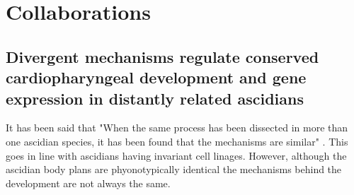 \chapter{Collaborations}
\section{Divergent mechanisms regulate conserved cardiopharyngeal development and gene expression in distantly related ascidians}

It has been said that "When the same process has been dissected in more than one ascidian species, it has been found that the mechanisms are similar" \cite{lemaire_ascidians_2008}. This goes in line with ascidians having invariant cell linages. However, although the ascidian body plans are phyonotypically identical the mechanisms behind the development are not always the same. 